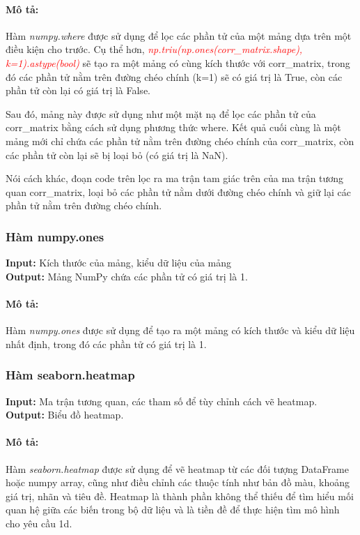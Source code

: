 \documentclass[]{article}
\begin{document}
\paragraph{Mô tả:}

Hàm \textit{numpy.where} \cite{numpyNumpywhere} được sử dụng để lọc các phần tử của một mảng dựa trên một điều kiện cho trước. Cụ thể hơn, \textcolor{red}{\textit{np.triu(np.ones(corr\_matrix.shape), k=1).astype(bool)}} sẽ tạo ra một mảng có cùng kích thước với corr\_matrix, trong đó các phần tử nằm trên đường chéo chính (k=1) sẽ có giá trị là True, còn các phần tử còn lại có giá trị là False.

Sau đó, mảng này được sử dụng như một mặt nạ để lọc các phần tử của corr\_matrix bằng cách sử dụng phương thức where. Kết quả cuối cùng là một mảng mới chỉ chứa các phần tử nằm trên đường chéo chính của corr\_matrix, còn các phần tử còn lại sẽ bị loại bỏ (có giá trị là NaN).

Nói cách khác, đoạn code trên lọc ra ma trận tam giác trên của ma trận tương quan corr\_matrix, loại bỏ các phần tử nằm dưới đường chéo chính và giữ lại các phần tử nằm trên đường chéo chính.

\subsubsection{Hàm numpy.ones}
\noindent
\textbf{Input:} Kích thước của mảng, kiểu dữ liệu của mảng \\
\textbf{Output:} Mảng NumPy chứa các phần tử có giá trị là 1.
\paragraph{Mô tả:}

Hàm \textit{numpy.ones} \cite{numpyNumpyones} được sử dụng để tạo ra một mảng có kích thước và kiểu dữ liệu nhất định, trong đó các phần tử có giá trị là 1.

\subsubsection{Hàm seaborn.heatmap}
\noindent
\textbf{Input:} Ma trận tương quan, các tham số để tùy chỉnh cách vẽ heatmap. \\
\textbf{Output:} Biểu đồ heatmap.
\paragraph{Mô tả:}

Hàm \textit{seaborn.heatmap} \cite{pydataSeabornheatmap} được sử dụng để vẽ heatmap từ các đối tượng DataFrame hoặc numpy array, cũng như điều chỉnh các thuộc tính như bản đồ màu, khoảng giá trị, nhãn và tiêu đề. Heatmap là thành phần không thể thiếu để tìm hiểu mối quan hệ giữa các biến trong bộ dữ liệu và là tiền đề để thực hiện tìm mô hình cho yêu cầu 1d.
\end{document}

